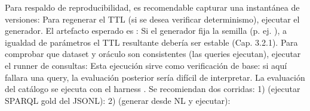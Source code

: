 {}\markdownRendererInterblockSeparator
{}Para respaldo de reproducibilidad, es recomendable capturar una instantánea de versiones:\markdownRendererInterblockSeparator
{}\markdownRendererInterblockSeparator
{}\markdownRendererInterblockSeparator
{}Para regenerar el TTL (si se desea verificar determinismo), ejecutar el generador. El artefacto esperado es :\markdownRendererInterblockSeparator
{}\markdownRendererInterblockSeparator
{}Si el generador fija la semilla (p. ej. ), a igualdad de parámetros el TTL resultante debería ser estable (Cap. 3.2.1).\markdownRendererInterblockSeparator
{}\markdownRendererInterblockSeparator
{}Para comprobar que dataset y oráculo son consistentes (las queries ejecutan), ejecutar el runner de consultas:\markdownRendererInterblockSeparator
{}\markdownRendererInterblockSeparator
{}Esta ejecución sirve como verificación de base: si aquí fallara una query, la evaluación posterior sería difícil de interpretar.\markdownRendererInterblockSeparator
{}\markdownRendererInterblockSeparator
{}La evaluación del catálogo se ejecuta con el harness . Se recomiendan dos corridas:\markdownRendererInterblockSeparator
{}1)  (ejecutar SPARQL gold del JSONL):\markdownRendererInterblockSeparator
{}\markdownRendererInterblockSeparator
{}2)  (generar desde NL y ejecutar):\markdownRendererInterblockSeparator
{}\markdownRendererInterblockSeparator
